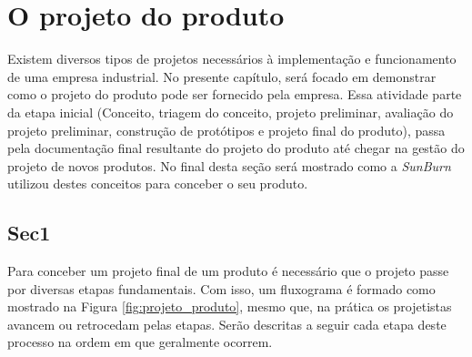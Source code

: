 \chapter{O projeto do produto} 
\label{chap:projeto_do_produto} 

Existem diversos tipos de projetos necessários à implementação e funcionamento de uma empresa industrial. No presente capítulo, será focado em demonstrar como o projeto do produto pode ser fornecido pela empresa. Essa atividade parte da etapa inicial (Conceito, triagem do conceito, projeto preliminar, avaliação do projeto preliminar, construção de protótipos e projeto final do produto), passa pela documentação final resultante do projeto do produto até chegar na gestão do projeto de novos produtos. No final desta seção será mostrado como a \textit{SunBurn} utilizou destes conceitos para conceber o seu produto.

\section{Sec1} 
\label{sec:projeto_do_produto_sec1} 

Para conceber um projeto final de um produto é necessário que o projeto passe por diversas etapas fundamentais. Com isso, um fluxograma é formado como mostrado na Figura \ref{fig:projeto_produto}, mesmo que, na prática os projetistas avancem ou retrocedam pelas etapas. Serão descritas a seguir cada etapa deste processo na ordem em que geralmente ocorrem.

